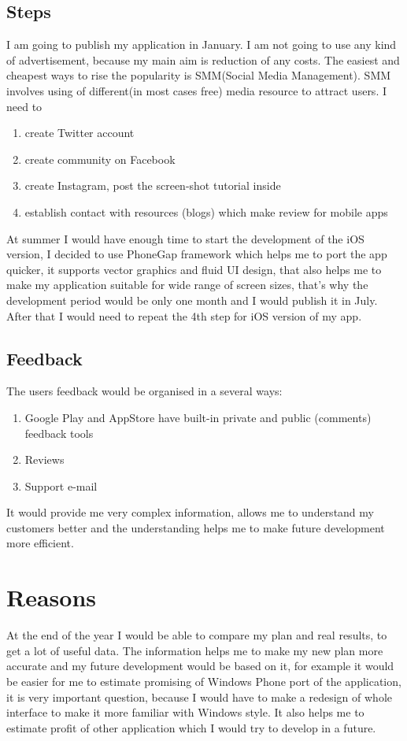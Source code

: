 \documentclass[english]{article}
\begin{document}
\subsection{Steps}

I am going to publish my application in January. I am not going to use any kind of advertisement, because my main aim is reduction of any costs. The easiest and cheapest ways to rise the popularity  is SMM(Social Media Management). SMM involves using of different(in most cases free) media resource to attract users. I need to
\begin{enumerate}
\item create Twitter account
\item create community on Facebook
\item create Instagram, post the screen-shot tutorial inside
\item establish contact with resources (blogs) which make review for mobile apps
\end{enumerate}

At summer I would have enough time to start the development of the iOS version, I decided to use PhoneGap framework which helps me to port the app quicker, it supports vector graphics and fluid  UI design, that also helps me to make my application suitable for wide range of screen sizes, that's why  the development period would be only one month and I would publish it in July.\\

After that I would need to repeat the 4th step for iOS version of my app.


\subsection{Feedback}
The users feedback would be organised in a several ways:
\begin{enumerate}
\item Google Play and AppStore have built-in private and public (comments) feedback tools 
\item Reviews
\item Support e-mail
\end{enumerate}
It would provide me very complex information, allows me to understand my customers better and the understanding helps me to make future development more efficient.
\section{Reasons}
At the end of the year I would be able to compare my plan and real results, to get a lot of useful data. The information helps me to make my new plan more accurate and my future development would be based on it, for example it would be easier for me to estimate promising of Windows Phone port of the application, it is very important question, because I would have to make a redesign of whole interface to make it more familiar with Windows style. It also helps me to estimate profit of  other application which I would try to develop in a future. 
\end{document}
